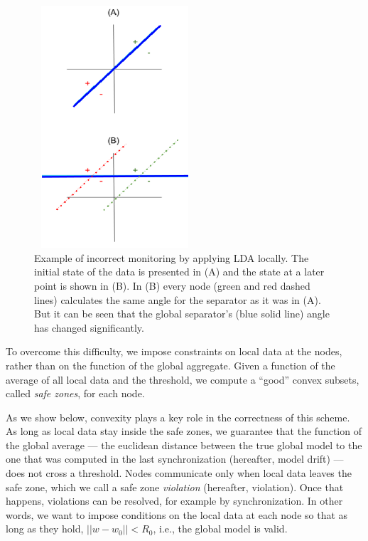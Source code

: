 \documentclass{vldb}
\begin{document}
\begin{figure}[h]
\centering
\includegraphics[width=60mm, height=9cm]{NegativeExample.png}
\caption{Example of incorrect monitoring by applying LDA locally. The
initial state of the data is presented in (A) and the state at a later point
is shown in (B). In (B) every node (green and red dashed lines) calculates the same angle
for the separator as it was in (A). But it can be
seen that the global separator's (blue solid line) angle has changed
significantly.}
\label{NegativeExample}
\end{figure}


\par To overcome this difficulty, we impose constraints on local data at the nodes, rather than on the function of the global aggregate. Given a function of the average of all local data and the threshold, we compute a ``good'' convex subsets, called \textit{safe zones}, for each node.

\par As we show below, convexity plays a key role in the correctness of this scheme. As long as local data stay inside the safe zones, we guarantee that the function of the global average ---  the euclidean distance between the true global model to the one that was computed in the last synchronization (hereafter, model drift) --- does not cross a threshold.
Nodes communicate only when local data leaves the
safe zone, which we call a safe zone \textit{violation} (hereafter,
violation). Once that happens, violations can be resolved,
for example by synchronization.
In other words, we want to impose conditions on the local
data at each node so that as long as they hold, $||w-w_0||<R_0$, i.e., the global model is valid.
\end{document}
